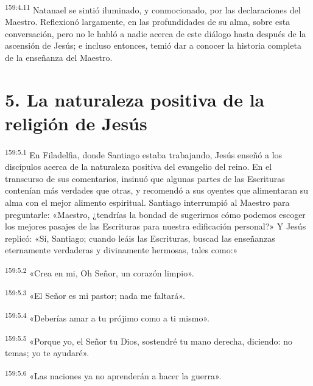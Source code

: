 \par 
\textsuperscript{159:4.11} Natanael se sintió iluminado, y conmocionado, por las declaraciones del Maestro. Reflexionó largamente, en las profundidades de su alma, sobre esta conversación, pero no le habló a nadie acerca de este diálogo hasta después de la ascensión de Jesús; e incluso entonces, temió dar a conocer la historia completa de la enseñanza del Maestro.

\section*{5. La naturaleza positiva de la religión de Jesús}
\par 
\textsuperscript{159:5.1} En Filadelfia, donde Santiago estaba trabajando, Jesús enseñó a los discípulos acerca de la naturaleza positiva del evangelio del reino. En el transcurso de sus comentarios, insinuó que algunas partes de las Escrituras contenían más verdades que otras, y recomendó a sus oyentes que alimentaran su alma con el mejor alimento espiritual. Santiago interrumpió al Maestro para preguntarle: «Maestro, ¿tendrías la bondad de sugerirnos cómo podemos escoger los mejores pasajes de las Escrituras para nuestra edificación personal?» Y Jesús replicó: «Sí, Santiago; cuando leáis las Escrituras, buscad las enseñanzas eternamente verdaderas y divinamente hermosas, tales como:»

\par 
\textsuperscript{159:5.2} «Crea en mi, Oh Señor, un corazón limpio».

\par 
\textsuperscript{159:5.3} «El Señor es mi pastor; nada me faltará».

\par 
\textsuperscript{159:5.4} «Deberías amar a tu prójimo como a ti mismo».

\par 
\textsuperscript{159:5.5} «Porque yo, el Señor tu Dios, sostendré tu mano derecha, diciendo: no temas; yo te ayudaré».

\par 
\textsuperscript{159:5.6} «Las naciones ya no aprenderán a hacer la guerra».

